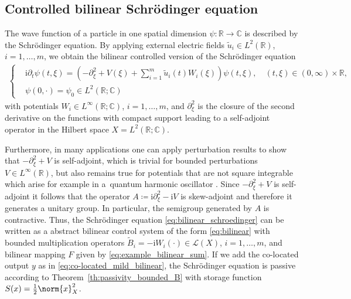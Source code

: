 \documentclass{cocv}
\newcommand{\RR}{\mathbb R}
\newcommand{\CC}{\mathbb C}
\theoremstyle{definition}
\begin{document}
\subsection{Controlled bilinear Schrödinger equation}
The wave function of a particle in one spatial dimension $\psi:\RR\rightarrow\CC$ is described by the Schrödinger equation. By applying external electric fields $\tilde u_i\in L^2(\RR)$, $i=1,\ldots,m$, we obtain the bilinear controlled version of the Schrödinger equation \cite{ChamP23} 
\begin{align}
\label{eq:bilinear_schroedinger}
\left\{
\begin{aligned}
&\mathrm{i}\partial_t\psi(t,\xi)=\left(-\partial_\xi^2+V(\xi)+\sum_{i=1}^m\tilde u_i(t)W_i(\xi)\right)\psi(t,\xi),\quad  (t,\xi) \in (0, \infty) \times \RR,\\
&\psi(0,\cdot)=\psi_0\in L^2(\RR;\CC)
\end{aligned}
\right.
\end{align}
with potentials $W_i\in L^\infty(\RR;\CC)$, $i=1,\ldots,m$, and $\partial_\xi^2$ is the closure of the second derivative on the functions with compact support leading to a self-adjoint operator in the Hilbert space $X=L^2(\RR;\CC)$. 

Furthermore, in many applications one can apply perturbation results to show that $-\partial_\xi^2+V$ is self-adjoint, which is trivial for bounded perturbations $V\in L^\infty(\RR)$, but also remains true for potentials that are not square integrable which arise for example in a~quantum harmonic oscillator \cite{Beauchard2013}.  Since  $-\partial_\xi^2+V$ is self-adjoint it follows that the operator
$A\coloneqq \mathrm{i}\partial_\xi^2-\mathrm{i}V$ is skew-adjoint and therefore it generates a unitary group. In particular, the semigroup generated by $A$ is contractive. Thus, the Schrödinger equation \eqref{eq:bilinear_schroedinger} can be written as a abstract bilinear control system of the form \eqref{eq:bilinear} with bounded multiplication operators $\tilde{B}_i=-\mathrm{i}W_i(\cdot)\in \mathcal{L}(X)$, $i=1,\ldots,m$, and bilinear mapping $F$ given by \eqref{eq:example_bilinear_sum}. If we add the co-located output $y$ as in \eqref{eq:co-located_mild_bilinear}, the Schrödinger equation is passive according to Theorem~\ref{th:passivity_bounded_B} with storage function $S(x) = \frac{1}{2}\norm{x}_X^2$.
\end{document}

